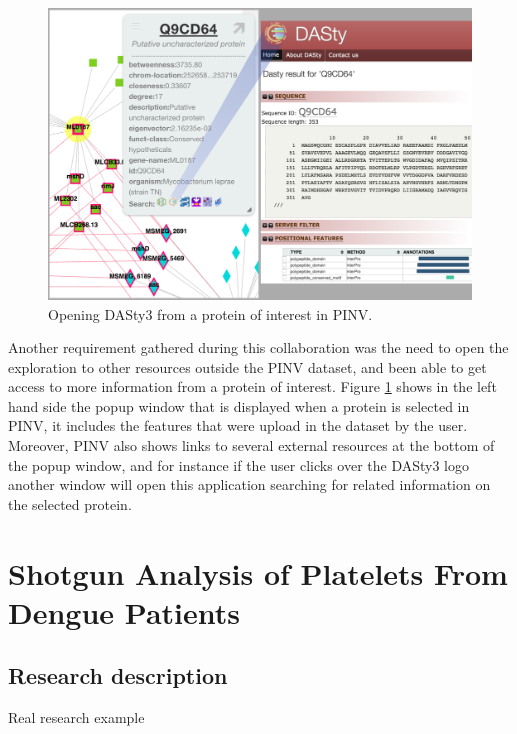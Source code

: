 \begin{figure}
\centering
\includegraphics[width=5in]{figures/pinv2dasty.png}
\caption[Opening DASty3 from a protein of interest in PINV.]{Opening DASty3 from a protein of interest in PINV.
\label{fig:pinv2dasty}}
\end{figure}

Another requirement gathered during this collaboration was the need to open the exploration to other resources outside the PINV dataset, and been able to get access to more information from a protein of interest. Figure \ref{fig:pinv2dasty} shows in the left hand side the popup window that is displayed when a protein is selected in PINV, it includes the features that were upload in the dataset by the user. Moreover, PINV also shows links to several external resources at the bottom of the popup window, and for instance if the user clicks over the DASty3 logo another window will open this application searching for related information on the selected protein.



\section{Shotgun Analysis of Platelets From Dengue Patients}
\label{sec:dengue}
\subsection{Research description}
Real research example

